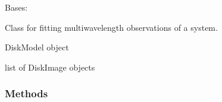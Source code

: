 \documentclass[a4paper,11pt,english]{sphinxmanual}
\begin{document}
\begin{fulllineitems}
\label{\detokenize{x22:disk_model.DiskFitting}}
\pysigstartsignatures
\pysiglinewithargsret
{}
{\sphinxparamcomma {}\sphinxparamcomma {}}
{}
\pysigstopsignatures
\sphinxAtStartPar
Bases: 

\sphinxAtStartPar
Class for fitting multi\sphinxhyphen{}wavelength observations of a system.

\begin{fulllineitems}
\label{\detokenize{x22:disk_model.DiskFitting.source_name}}
\pysigstartsignatures
\pysigline
{}
\pysigstopsignatures
\end{fulllineitems}


\begin{fulllineitems}
\label{\detokenize{x22:disk_model.DiskFitting.disk_model}}
\pysigstartsignatures
\pysigline
{}
\pysigstopsignatures
\sphinxAtStartPar
DiskModel object

\end{fulllineitems}


\begin{fulllineitems}
\label{\detokenize{x22:disk_model.DiskFitting.disk_image_list}}
\pysigstartsignatures
\pysigline
{}
\pysigstopsignatures
\sphinxAtStartPar
list of DiskImage objects

\end{fulllineitems}

\subsubsection*{Methods}



\end{fulllineitems}
\end{document}
